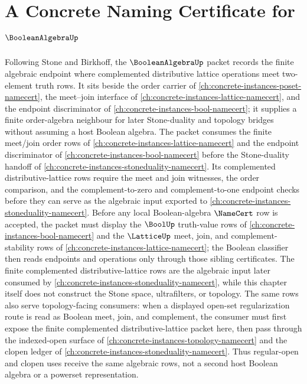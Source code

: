 \chapter{A Concrete Naming Certificate for $\BooleanAlgebraUp$}
\label{ch:concrete-instances-booleanalgebra-namecert}

Following Stone and Birkhoff, the $\BooleanAlgebraUp$ packet records the finite algebraic endpoint where complemented distributive lattice operations meet two-element truth rows. It sits beside the order carrier of \autoref{ch:concrete-instances-poset-namecert}, the meet--join interface of \autoref{ch:concrete-instances-lattice-namecert}, and the endpoint discriminator of \autoref{ch:concrete-instances-bool-namecert}; it supplies a finite order-algebra neighbour for later Stone-duality and topology bridges without assuming a host Boolean algebra.
The packet consumes the finite meet/join order rows of \autoref{ch:concrete-instances-lattice-namecert} and the endpoint discriminator of \autoref{ch:concrete-instances-bool-namecert} before the Stone-duality handoff of \autoref{ch:concrete-instances-stoneduality-namecert}.
Its complemented distributive-lattice rows require the meet and join witnesses, the order comparison, and the complement-to-zero and complement-to-one endpoint checks before they can serve as the algebraic input exported to \autoref{ch:concrete-instances-stoneduality-namecert}.
Before any local Boolean-algebra $\NameCert$ row is accepted, the packet must display the $\BoolUp$ truth-value rows of \autoref{ch:concrete-instances-bool-namecert} and the $\LatticeUp$ meet, join, and complement-stability rows of \autoref{ch:concrete-instances-lattice-namecert}; the Boolean classifier then reads endpoints and operations only through those sibling certificates.
The finite complemented distributive-lattice rows are the algebraic input later consumed by \autoref{ch:concrete-instances-stoneduality-namecert}, while this chapter itself does not construct the Stone space, ultrafilters, or topology.
The same rows also serve topology-facing consumers: when a displayed open-set regularization route is read as Boolean meet, join, and complement, the consumer must first expose the finite complemented distributive-lattice packet here, then pass through the indexed-open surface of \autoref{ch:concrete-instances-topology-namecert} and the clopen ledger of \autoref{ch:concrete-instances-stoneduality-namecert}. Thus regular-open and clopen uses receive the same algebraic rows, not a second host Boolean algebra or a powerset representation.

